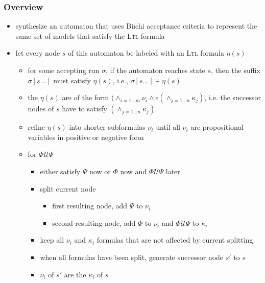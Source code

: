 \documentclass[a4paper, 10pt]{article}
\begin{document}
\subsubsection*{Overview}
\begin{itemize}
    \item synthesize an automaton that uses Büchi acceptance criteria to represent the same set of models that satisfy the \textsc{Ltl} formula
    \item let every node $s$ of this automaton be labeled with an \textsc{Ltl} formula $\eta(s)$
    \begin{itemize}
        \item for some accepting run $\sigma$, if the automaton reaches state $s$, then the suffix $\sigma[s\dots]$ must satisfy $\eta(s)$, i.e., $\sigma[s\dots]\models\eta(s)$
        \item the $\eta(s)$ are of the form $(\wedge_{i=1\dots m}\nu_i\wedge\circ(\wedge_{j=1\dots n} \kappa_j)$, i.e. the successor nodes of $s$ have to satisfy $(\wedge_{j=1\dots n}\kappa_j)$
        \item refine $\eta(s)$ into shorter subformulas $\nu_i$ until all $\nu_i$ are propositional variables in positive or negative form
    \end{itemize}
    \begin{center}
    \scalebox{.8}{}
    \end{center}
    \begin{itemize}
        \item for $\Phi \mathcal{U} \Psi$
        \begin{itemize}
            \item either satisfy $\Psi$ now or $\Phi$ now and $\Phi \mathcal{U} \Psi$ later
            \item split current node
            \begin{itemize}
                \item first resulting node, add $\Psi$ to $\nu_i$
                \item second resulting node, add $\Phi$ to $\nu_i$ and $\Phi \mathcal{U} \Psi$ to $\kappa_i$
            \end{itemize}
            \item keep all $\nu_i$ and $\kappa_i$ formulas that are not affected by current splitting
            \item when all formulas have been split, generate successor node $s'$ to $s$
            \item $\nu_i$ of $s'$ are the $\kappa_i$ of $s$

\end{itemize}
\end{itemize}
\end{itemize}
\end{document}
